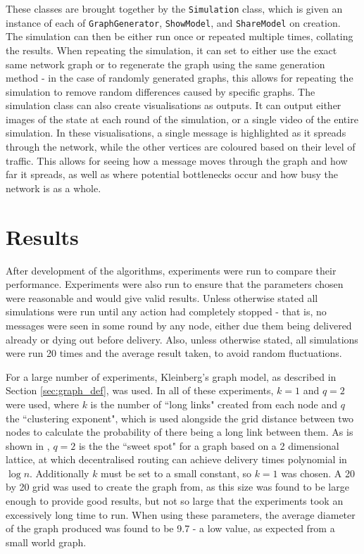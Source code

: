 \documentclass[bsc,frontabs,twoside,singlespacing,parskip,deptreport]{infthesis}     %
\begin{document}
These classes are brought together by the \texttt{Simulation} class, which is given an instance of each of \texttt{GraphGenerator}, \texttt{ShowModel}, and \texttt{ShareModel} on creation. The simulation can then be either run once or repeated multiple times, collating the results. When repeating the simulation, it can set to either use the exact same network graph or to regenerate the graph using the same generation method - in the case of randomly generated graphs, this allows for repeating the simulation to remove random differences caused by specific graphs. The simulation class can also create visualisations as outputs. It can output either images of the state at each round of the simulation, or a single video of the entire simulation. In these visualisations, a single message is highlighted as it spreads through the network, while the other vertices are coloured based on their level of traffic. This allows for seeing how a message moves through the graph and how far it spreads, as well as where potential bottlenecks occur and how busy the network is as a whole.


\chapter{Results}
After development of the algorithms, experiments were run to compare their performance. Experiments were also run to ensure that the parameters chosen were reasonable and would give valid results. Unless otherwise stated all simulations were run until any action had completely stopped - that is, no messages were seen in some round by any node, either due them being delivered already or dying out before delivery. Also, unless otherwise stated, all simulations were run 20 times and the average result taken, to avoid random fluctuations.

For a large number of experiments, Kleinberg's graph model, as described in Section \ref{sec:graph_def}, was used. In all of these experiments, $k=1$ and $q=2$ were used, where $k$ is the number of ``long links" created from each node and $q$ the ``clustering exponent", which is used alongside the grid distance between two nodes to calculate the probability of there being a long link between them. As is shown in \cite{Kleinberg00},  $q=2$ is the the ``sweet spot" for a graph based on a 2 dimensional lattice, at which decentralised routing can achieve delivery times polynomial in $\log n$. Additionally $k$ must be set to a small constant, so $k=1$ was chosen. A 20 by 20 grid was used to create the graph from, as this size was found to be large enough to provide good results, but not so large that the experiments took an excessively long time to run. When using these parameters, the average diameter of the graph produced was found to be 9.7 - a low value, as expected from a small world graph.
\end{document}
